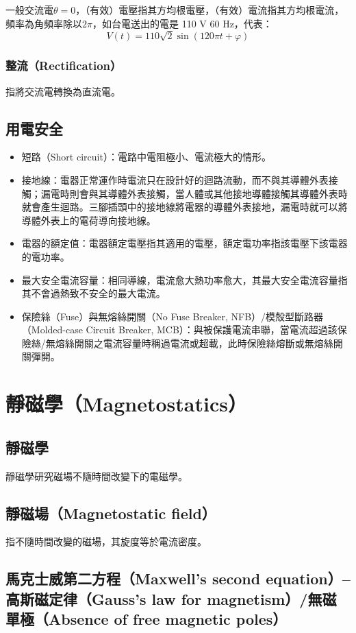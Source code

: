 \documentclass[a4paper,12pt]{report}
\begin{document}
\begin{itemize}
一般交流電$\theta=0$，（有效）電壓指其方均根電壓，（有效）電流指其方均根電流，頻率為角頻率除以$2\pi$，如台電送出的電是 110 V 60 Hz，代表：
\[V(t)=110\sqrt{2}\sin(120\pi t+\varphi)\]
\subsubsection{整流（Rectification）}
指將交流電轉換為直流電。
\subsection{用電安全}
\begin{itemize}
\item 短路（Short circuit）：電路中電阻極小、電流極大的情形。
\item 接地線：電器正常運作時電流只在設計好的迴路流動，而不與其導體外表接觸；漏電時則會與其導體外表接觸，當人體或其他接地導體接觸其導體外表時就會產生迴路。三腳插頭中的接地線將電器的導體外表接地，漏電時就可以將導體外表上的電荷導向接地線。
\item 電器的額定值：電器額定電壓指其適用的電壓，額定電功率指該電壓下該電器的電功率。
\item 最大安全電流容量：相同導線，電流愈大熱功率愈大，其最大安全電流容量指其不會過熱致不安全的最大電流。
\item 保險絲（Fuse）與無熔絲開關（No Fuse Breaker, NFB）/模殼型斷路器（Molded-case Circuit Breaker, MCB）：與被保護電流串聯，當電流超過該保險絲/無熔絲開關之電流容量時稱過電流或超載，此時保險絲熔斷或無熔絲開關彈開。
\end{itemize}


\section{靜磁學（Magnetostatics）}
\subsection{靜磁學}
靜磁學研究磁場不隨時間改變下的電磁學。
\subsection{靜磁場（Magnetostatic field）}
指不隨時間改變的磁場，其旋度等於電流密度。
\subsection{馬克士威第二方程（Maxwell's second equation）–高斯磁定律（Gauss's law for magnetism）/無磁單極（Absence of free magnetic poles）}

\end{itemize}
\end{document}
